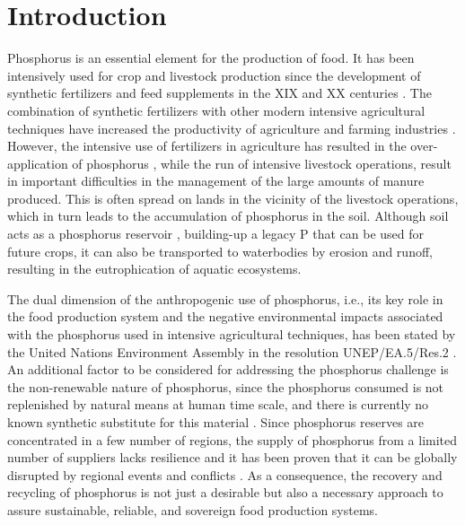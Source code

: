 \documentclass[authoryear]{elsarticle}
\begin{document}

\section{Introduction}
Phosphorus is an essential element for the production of food. It has been intensively used for crop and livestock production since the development of synthetic fertilizers and feed supplements in the XIX and XX centuries \citep{Kausar19}. The combination of synthetic fertilizers with other modern intensive agricultural techniques have increased the productivity of agriculture and farming industries \citep{pingali2012green}.
However, the intensive use of fertilizers in agriculture has resulted in the over-application of phosphorus \citep{reid2019phosphorus}, while the run of intensive livestock operations,
result in important difficulties in the management of the large amounts of manure produced. This is often spread on lands in the vicinity of the livestock operations, which in turn leads to the accumulation of phosphorus in the soil. Although soil acts as a phosphorus reservoir \citep{ehlert2003potential}, building-up a legacy P that can be used for future crops, it can also be transported to waterbodies by erosion and runoff, resulting in the eutrophication of aquatic ecosystems.

The dual dimension of the anthropogenic use of phosphorus, i.e., its key role in the food production system and the negative environmental impacts associated with the phosphorus used in intensive agricultural techniques, has been stated by the United Nations Environment Assembly in the resolution UNEP/EA.5/Res.2 \citep{UN_Phosphorus}. An additional factor to be considered for addressing the phosphorus challenge is the non-renewable nature of phosphorus, since the phosphorus consumed is not replenished by natural means at human time scale, and there is currently no known synthetic substitute for this material \citep{cordell2009story}. Since phosphorus reserves are concentrated in a few number of regions, the supply of phosphorus from a limited number of suppliers lacks resilience and it has been proven that it can be globally disrupted by regional events and conflicts
\citep{FAO_UkraineWar}. As a consequence, the recovery and recycling of phosphorus is not just a desirable but also a necessary approach to assure sustainable, reliable, and sovereign food production systems. 
\end{document}
